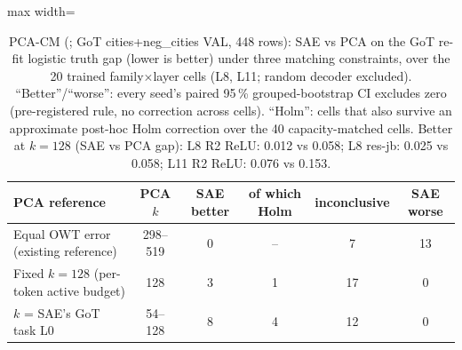 \begin{table}[t]
\centering
\small
\caption{PCA-CM (; GoT cities+neg\_cities VAL, 448 rows): SAE vs PCA on the GoT re-fit logistic truth gap (lower is better) under three matching constraints, over the 20 trained family$\times$layer cells (L8, L11; random decoder excluded). ``Better''/``worse'': every seed's paired 95\,\% grouped-bootstrap CI excludes zero (pre-registered rule, no correction across cells). ``Holm'': cells that also survive an approximate post-hoc Holm correction over the 40 capacity-matched cells. Better at $k=128$ (SAE vs PCA gap): L8 R2 ReLU: 0.012 vs 0.058; L8 res-jb: 0.025 vs 0.058; L11 R2 ReLU: 0.076 vs 0.153.}
\label{tab:pcacm}
\begin{adjustbox}{max width=\linewidth}
\begin{tabular}{lccccc}
\toprule
PCA reference & PCA $k$ & SAE better & of which Holm & inconclusive & SAE worse \\
\midrule
Equal OWT error (existing reference) & 298--519 & 0 & -- & 7 & 13 \\
Fixed $k=128$ (per-token active budget) & 128 & 3 & 1 & 17 & 0 \\
$k$ = SAE's GoT task L0 & 54--128 & 8 & 4 & 12 & 0 \\
\bottomrule
\end{tabular}
\end{adjustbox}
\end{table}
